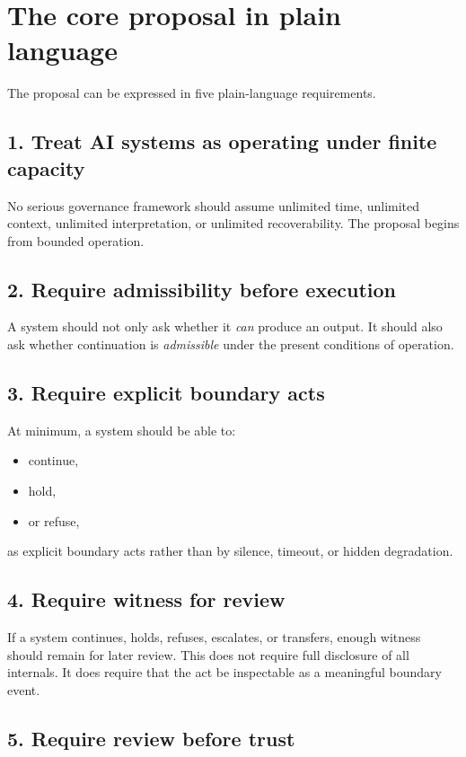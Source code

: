 \documentclass[11pt]{article}
\begin{document}
\section{The core proposal in plain language}

The proposal can be expressed in five plain-language requirements.

\subsection*{1. Treat AI systems as operating under finite capacity}

No serious governance framework should assume unlimited time, unlimited context, unlimited interpretation, or unlimited recoverability. The proposal begins from bounded operation.

\subsection*{2. Require admissibility before execution}

A system should not only ask whether it \emph{can} produce an output. It should also ask whether continuation is \emph{admissible} under the present conditions of operation.

\subsection*{3. Require explicit boundary acts}

At minimum, a system should be able to:
\begin{itemize}[leftmargin=2em]
    \item continue,
    \item hold,
    \item or refuse,
\end{itemize}
as explicit boundary acts rather than by silence, timeout, or hidden degradation.

\subsection*{4. Require witness for review}

If a system continues, holds, refuses, escalates, or transfers, enough witness should remain for later review. This does not require full disclosure of all internals. It does require that the act be inspectable as a meaningful boundary event.

\subsection*{5. Require review before trust}
\end{document}
